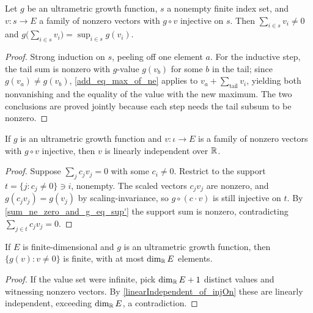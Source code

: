 \begin{lemma}\label{sum_ne_zero_and_g_eq_sup'}
  \leanok
  Let $g$ be an ultrametric growth function, $s$ a nonempty finite index set,
  and $v\colon s\to E$ a family of nonzero vectors with $g\circ v$ injective on
  $s$. Then $\sum_{i\in s} v_i \neq 0$ and
  $g\bigl(\sum_{i\in s} v_i\bigr) = \sup_{i\in s} g(v_i)$.
  \begin{proof}\leanok
  Strong induction on $s$, peeling off one element $a$. For the inductive step,
  the tail sum is nonzero with $g$-value $g(v_b)$ for some $b$ in the tail; since
  $g(v_a)\neq g(v_b)$, \ref{add_eq_max_of_ne} applies to
  $v_a + \sum_{\text{tail}} v_i$, yielding both nonvanishing and the equality of
  the value with the new maximum. The two conclusions are proved jointly because
  each step needs the tail subsum to be nonzero.
  \end{proof}
\end{lemma}

\begin{lemma}\label{linearIndependent_of_injOn}
  \leanok
  If $g$ is an ultrametric growth function and $v\colon \iota\to E$ is a family
  of nonzero vectors with $g\circ v$ injective, then $v$ is linearly
  independent over $\mathbb{R}$.
  \begin{proof}\leanok
  Suppose $\sum_{j} c_j v_j = 0$ with some $c_i\neq 0$. Restrict to the support
  $t=\{j : c_j\neq 0\}\ni i$, nonempty. The scaled vectors $c_j v_j$ are nonzero,
  and $g(c_j v_j)=g(v_j)$ by scaling-invariance, so $g\circ(c\cdot v)$ is still
  injective on $t$. By \ref{sum_ne_zero_and_g_eq_sup'} the support sum is
  nonzero, contradicting $\sum_{j\in t} c_j v_j=0$.
  \end{proof}
\end{lemma}

\begin{lemma}\label{finite_range}
  \leanok
  If $E$ is finite-dimensional and $g$ is an ultrametric growth function, then
  $\{g(v) : v\neq 0\}$ is finite, with at most $\dim_{\mathbb{R}} E$ elements.
  \begin{proof}\leanok
  If the value set were infinite, pick $\dim_{\mathbb{R}} E + 1$ distinct values and
  witnessing nonzero vectors. By \ref{linearIndependent_of_injOn} these are
  linearly independent, exceeding $\dim_{\mathbb{R}} E$, a contradiction.
  \end{proof}
\end{lemma}

